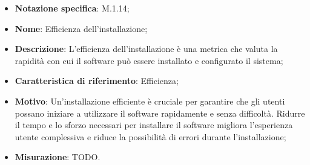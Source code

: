 \begin{itemize}
    \item \textbf{Notazione specifica}: M.1.14;
    \item \textbf{Nome}: Efficienza dell'installazione;
    \item \textbf{Descrizione}: L'efficienza dell'installazione è una metrica che valuta la rapidità con cui il software può essere installato e configurato il sistema;
    \item \textbf{Caratteristica di riferimento}: Efficienza;
    \item \textbf{Motivo}: Un'installazione efficiente è cruciale per garantire che gli utenti possano iniziare a utilizzare il software rapidamente e senza difficoltà. Ridurre il tempo e lo sforzo necessari per installare il software migliora l'esperienza utente complessiva e riduce la possibilità di errori durante l'installazione;
    \item \textbf{Misurazione}: TODO.
\end{itemize}
